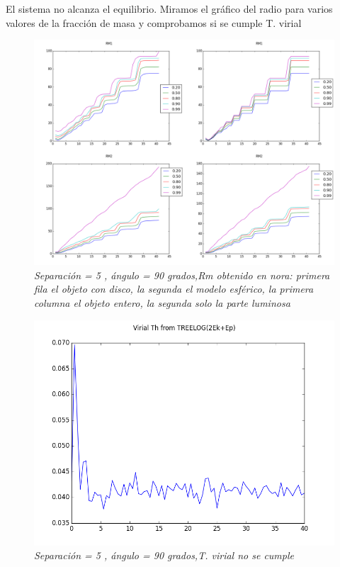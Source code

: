 \documentclass[12pt]{article} %
\renewcommand{\=}[1]{\stackrel{#1}{=}} %
\theoremstyle{definition}
\theoremstyle{remark}
\begin{document}
El sistema no alcanza el equilibrio. Miramos el gráfico del radio para varios valores de la fracción de masa y comprobamos si se cumple T. virial

\begin{figure}[!ht]
 \centering
 \includegraphics[scale=0.2]{rmsep5.png}
 \caption{\emph{ Separación = 5 , ángulo = 90 grados,Rm obtenido en nora: primera fila el objeto con disco, la segunda el modelo esférico, la primera columna el objeto entero, la segunda solo la parte luminosa }}
\end{figure}

\begin{figure}[!ht]
 \centering
 \includegraphics[scale=0.4]{vt.png}
 \caption{\emph{ Separación = 5 , ángulo = 90 grados,T. virial no se cumple }}
\end{figure}
\end{document}
